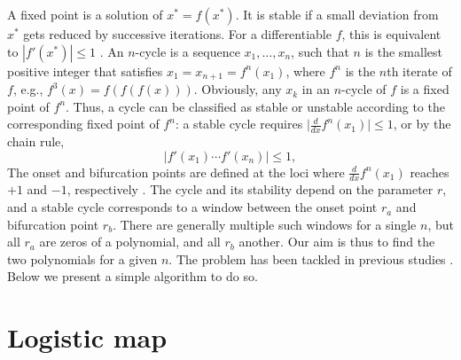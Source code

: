\documentclass{ws-ijbc}
\begin{document}
A fixed point is a solution of $x^* = f(x^*)$.
%
It is stable if a small deviation from $x^*$
  gets reduced by successive iterations.
%
For a differentiable $f$,
  this is equivalent to $|f'(x^*)| \le 1$
  \cite{strogatz, hao}.
%
An $n$-cycle is a sequence $x_1, \dots, x_n$,
  such that $n$ is the smallest positive integer
  that satisfies $x_1 = x_{n+1} = f^n(x_1)$,
  where $f^n$ is the $n$th iterate of $f$,
  e.g., $f^3(x) = f(f(f(x)))$.
Obviously, any $x_k$ in an $n$-cycle of $f$ is a fixed point of $f^n$.
%
%
%
Thus, a cycle can be classified as stable or unstable
  according to the corresponding fixed point of $f^n$:
  a stable cycle requires
  $\big| \frac {d} {dx} f^n(x_1) \big| \le 1$,
  or by the chain rule,
%
%
%
\begin{equation}
  \Big| f'(x_1) \cdots f'(x_n) \Big| \le 1,
\label{eq:der}
\end{equation}
%
%
The onset and bifurcation points
  are defined at the loci
  where $\frac {d} {dx} f^n(x_1)$ reaches $+1$ and $-1$,
  respectively \cite{strogatz, hao}.
%
%
%
The cycle and its stability depend on the parameter $r$,
%
and a stable cycle corresponds to a window
  between the onset point $r_a$ and bifurcation point $r_b$.
%
There are generally multiple such windows for a single $n$,
  but all $r_a$ are zeros of a polynomial,
  and all $r_b$ another.
%
Our aim is thus to find the two polynomials for a given $n$.
%
The problem has been tackled in previous studies
  \cite{brown1, brown2, stephenson1, stephenson2, stephenson3,
  saha, bechhoefer, gordon, burm, zhang, bailey1, bailey2, kk1, lewis}.
Below we present a simple algorithm to do so.
%
%
%
%







\section{\label{sec:logmap}Logistic map}
\end{document}
